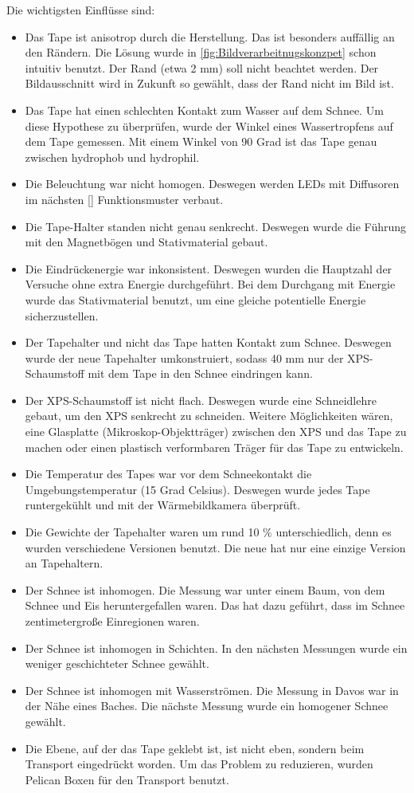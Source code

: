 Die wichtigsten Einflüsse sind:
\begin{itemize}
\item Das Tape ist anisotrop durch die Herstellung. Das ist besonders auffällig an den Rändern. Die Lösung wurde in \ref{fig:Bildverarbeitnugskonzpet} schon intuitiv benutzt. Der Rand (etwa 2 mm) soll nicht beachtet werden. Der Bildausschnitt wird in Zukunft so gewählt, dass der Rand nicht im Bild ist.
\item Das Tape hat einen schlechten Kontakt zum Wasser auf dem Schnee. Um diese Hypothese zu überprüfen, wurde der Winkel eines Wassertropfens auf dem Tape gemessen. Mit einem Winkel von 90 Grad ist das Tape genau zwischen hydrophob und hydrophil.
\item Die Beleuchtung war nicht homogen. Deswegen werden LEDs mit Diffusoren im nächsten \ref{} Funktionsmuster verbaut.
\item Die Tape-Halter standen nicht genau senkrecht. Deswegen wurde die Führung mit den Magnetbögen und Stativmaterial gebaut.
\item Die Eindrückenergie war inkonsistent. Deswegen wurden die Hauptzahl der Versuche ohne extra Energie durchgeführt. Bei dem Durchgang mit Energie wurde das Stativmaterial benutzt, um eine gleiche potentielle Energie sicherzustellen.
\item Der Tapehalter und nicht das Tape hatten Kontakt zum Schnee. Deswegen wurde der neue Tapehalter umkonstruiert, sodass 40 mm nur der XPS-Schaumstoff mit dem Tape in den Schnee eindringen kann.
\item Der XPS-Schaumstoff ist nicht flach. Deswegen wurde eine Schneidlehre gebaut, um den XPS senkrecht zu schneiden. Weitere Möglichkeiten wären, eine Glasplatte (Mikroskop-Objektträger) zwischen den XPS und das Tape zu machen oder einen plastisch verformbaren Träger für das Tape zu entwickeln.
\item Die Temperatur des Tapes war vor dem Schneekontakt die Umgebungstemperatur (15 Grad Celsius). Deswegen wurde jedes Tape runtergekühlt und mit der Wärmebildkamera überprüft.
\item Die Gewichte der Tapehalter waren um rund 10 \% unterschiedlich, denn es wurden verschiedene Versionen benutzt. Die neue hat nur eine einzige Version an Tapehaltern.
\item Der Schnee ist inhomogen. Die Messung war unter einem Baum, von dem Schnee und Eis heruntergefallen waren. Das hat dazu geführt, dass im Schnee zentimetergroße Einregionen waren.
\item Der Schnee ist inhomogen in Schichten. In den nächsten Messungen wurde ein weniger geschichteter Schnee gewählt.
\item Der Schnee ist inhomogen mit Wasserströmen. Die Messung in Davos war in der Nähe eines Baches. Die nächste Messung wurde ein homogener Schnee gewählt.
\item Die Ebene, auf der das Tape geklebt ist, ist nicht eben, sondern beim Transport eingedrückt worden. Um das Problem zu reduzieren, wurden Pelican Boxen für den Transport benutzt.
\end{itemize}

